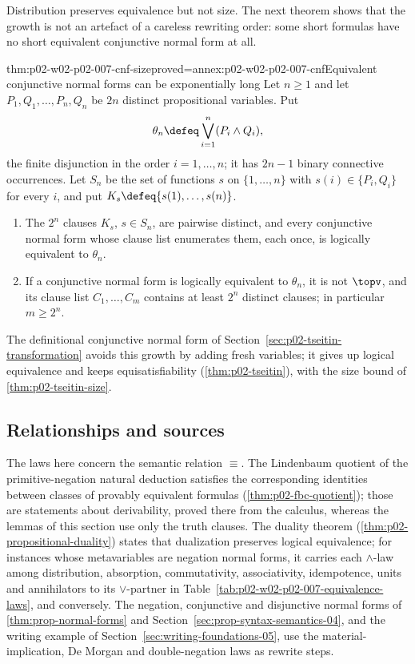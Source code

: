 Distribution preserves equivalence but not size.  The next theorem shows
that the growth is not an artefact of a careless rewriting order: some short
formulas have no short equivalent conjunctive normal form at all.

\begin{hbtheorem}{thm:p02-w02-p02-007-cnf-size}{proved=annex:p02-w02-p02-007-cnf}{Equivalent conjunctive normal forms can be exponentially long}
Let \(n\geq1\) and let \(P_1,Q_1,\ldots,P_n,Q_n\) be \(2n\) distinct
propositional variables.  Put
\[
 \theta_n\defeq\bigvee_{i=1}^{n}(P_i\land Q_i),
\]
the finite disjunction in the order \(i=1,\ldots,n\); it has \(2n-1\)
binary connective occurrences.  Let \(S_n\) be the set of functions \(s\) on
\(\{1,\ldots,n\}\) with \(s(i)\in\{P_i,Q_i\}\) for every \(i\), and put
\(K_s\defeq\{s(1),\ldots,s(n)\}\).
\begin{enumerate}
  \item The \(2^n\) clauses \(K_s\), \(s\in S_n\), are pairwise distinct, and
        every conjunctive normal form whose clause list enumerates them, each
        once, is logically equivalent to \(\theta_n\).
  \item If a conjunctive normal form is logically equivalent to
        \(\theta_n\), it is not \(\topv\), and its clause list
        \(C_1,\ldots,C_m\) contains at least \(2^n\) distinct clauses; in
        particular \(m\geq2^n\).
\end{enumerate}
\end{hbtheorem}

The definitional conjunctive normal form of
Section~\ref{sec:p02-tseitin-transformation} avoids this growth by adding
fresh variables; it gives up logical equivalence and keeps
equisatisfiability (\cref{thm:p02-tseitin}), with the size bound of
\cref{thm:p02-tseitin-size}.

\subsection{Relationships and sources}
\label{sec:p02-w02-p02-007-relationships}

The laws here concern the semantic relation \(\equiv\).  The Lindenbaum
quotient of the primitive-negation natural deduction satisfies the
corresponding identities between classes of provably equivalent formulas
(\cref{thm:p02-fbc-quotient}); those are statements about derivability,
proved there from the calculus, whereas the lemmas of this section use only
the truth clauses.  The duality theorem (\cref{thm:p02-propositional-duality})
states that dualization preserves logical equivalence; for instances whose
metavariables are negation normal forms, it carries each \(\land\)-law among
distribution, absorption, commutativity, associativity, idempotence, units
and annihilators to its \(\lor\)-partner in
Table~\ref{tab:p02-w02-p02-007-equivalence-laws}, and conversely.  The negation, conjunctive and disjunctive normal forms of
\cref{thm:prop-normal-forms} and Section~\ref{sec:prop-syntax-semantics-04},
and the writing example of Section~\ref{sec:writing-foundations-05}, use the
material-implication, De Morgan and double-negation laws as rewrite steps.

